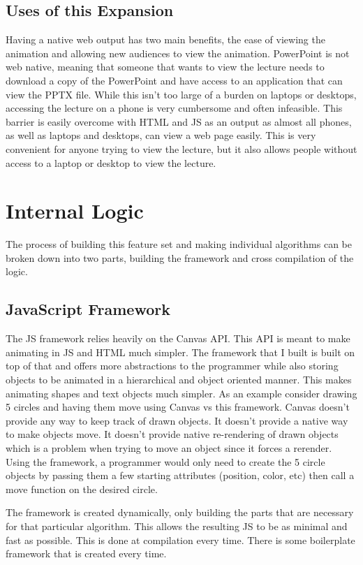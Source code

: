 \documentclass[12pt,twoside]{reedthesis}
\begin{document}
\subsection{Uses of this Expansion}
Having a native web output has two main benefits, the ease of viewing the animation and allowing new audiences to view the animation. PowerPoint is not web native, meaning that someone that wants to view the lecture needs to download a copy of the PowerPoint and have access to an application that can view the PPTX file. While this isn't too large of a burden on laptops or desktops, accessing the lecture on a phone is very cumbersome and often infeasible. This barrier is easily overcome with HTML and JS as an output as almost all phones, as well as laptops and desktops, can view a web page easily. This is very convenient for anyone trying to view the lecture, but it also allows people without access to a laptop or desktop to view the lecture. 

\section{Internal Logic}
The process of building this feature set and making individual algorithms can be broken down into two parts, building the framework and cross compilation of the logic. 

\subsection{JavaScript Framework}
The JS framework relies heavily on the Canvas API. This API is meant to make animating in JS and HTML much simpler. The framework that I built is built on top of that and offers more abstractions to the programmer while also storing objects to be animated in a hierarchical and object oriented manner. This makes animating shapes and text objects much simpler. As an example consider drawing 5 circles and having them move using Canvas vs this framework. Canvas doesn't provide any way to keep track of drawn objects. It doesn't provide a native way to make objects move. It doesn't provide native re-rendering of drawn objects which is a problem when trying to move an object since it forces a rerender. Using the framework, a programmer would only need to create the 5 circle objects by passing them a few starting attributes (position, color, etc) then call a move function on the desired circle.

The framework is created dynamically, only building the parts that are necessary for that particular algorithm. This allows the resulting JS to be as minimal and fast as possible. This is done at compilation every time. There is some boilerplate framework that is created every time. 
\end{document}
